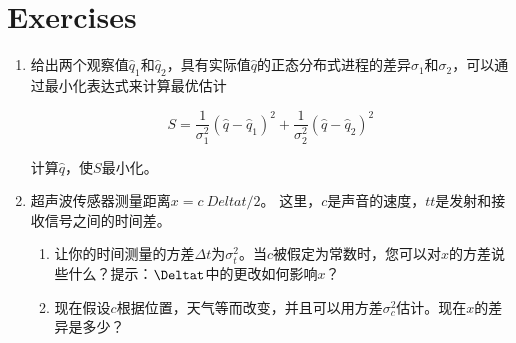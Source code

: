 \section*{Exercises}\small
\begin{enumerate}

\item 给出两个观察值$\hat{q}_1$和$\hat{q}_2$，具有实际值$\hat{q}$的正态分布式进程的差异$\sigma_1$和$\sigma_2$，可以通过最小化表达式来计算最优估计

\begin{equation}
\nonumber
S=\frac{1}{\sigma_1^2}(\hat{q}-\hat{q}_1)^2+\frac{1}{\sigma_2^2}(\hat{q}-\hat{q}_2)^2
\end{equation}

计算$\hat{q}$，使$S$最小化。


\item 超声波传感器测量距离$ x = c \ Delta t / 2 $。 这里，$ c $是声音的速度，$ tt $是发射和接收信号之间的时间差。

\begin{enumerate}

\item 让你的时间测量的方差$\Delta t$为$\sigma_t^2$。当$c$被假定为常数时，您可以对$x$的方差说些什么？提示：$\Deltat$中的更改如何影响$x$？
\item 现在假设$c$根据位置，天气等而改变，并且可以用方差$\sigma_c^2$估计。现在$x$的差异是多少？
\end{enumerate}


\end{enumerate}
